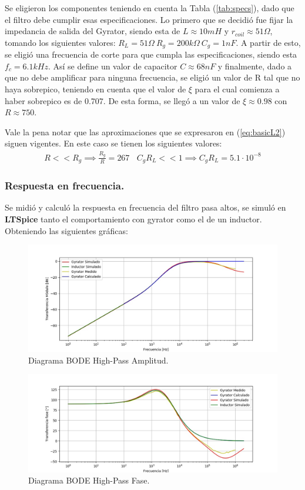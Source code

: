 Se eligieron los componentes teniendo en cuenta la Tabla (\ref{tab:specs}), dado que el filtro debe cumplir esas especificaciones.
Lo primero que se decidió fue fijar la impedancia de salida del Gyrator, siendo esta de $L \approx 10mH $ y $r_{coil} \approx 51\Omega $, tomando los siguientes valores: $R_L = 51\Omega \ R_g = 200k\Omega \ C_g = 1nF$.
A partir de esto, se eligió una frecuencia de corte para que cumpla las especificaciones, siendo esta $f_c =6.1kHz $. Así se define un valor de capacitor $C \approx 68nF$ y finalmente, dado a que no debe amplificar para ninguna frecuencia, se eligió un valor de R tal que no haya sobrepico, teniendo en cuenta que el valor de $\xi$ para el cual comienza a haber sobrepico es de 0.707. De esta forma, se llegó a un valor de $\xi \approx 0.98 $ con $R \approx 750 $.

Vale la pena notar que las aproximaciones que se expresaron en (\ref{eq:basicL2}) siguen vigentes. En este caso se tienen los siguientes valores:
\begin{align}  R<<R_g \implies  \frac{R_g}{R}=  267 \ \ \ \ C_gR_L << 1 \implies C_gR_L=5.1 \cdot 10^{-8} \end{align}

\subsubsection{Respuesta en frecuencia.}
Se midió y calculó la respuesta en frecuencia del filtro pasa altos, se simuló en \textbf{LTSpice} tanto el comportamiento con gyrator como el de un inductor. Obteniendo las siguientes gráficas:
\begin{figure}[H]	
	\centering
	\includegraphics[width=\textwidth]{ImagenesEj2/bodehp.jpg}
	\caption{Diagrama BODE High-Pass Amplitud.}
	\label{fig:bodehp}
\end{figure}
\begin{figure}[H]	
	\centering
	\includegraphics[width=\textwidth]{ImagenesEj2/bodehpp.jpg}
	\caption{Diagrama BODE High-Pass Fase.}
	\label{fig:bodehpp}
\end{figure}
